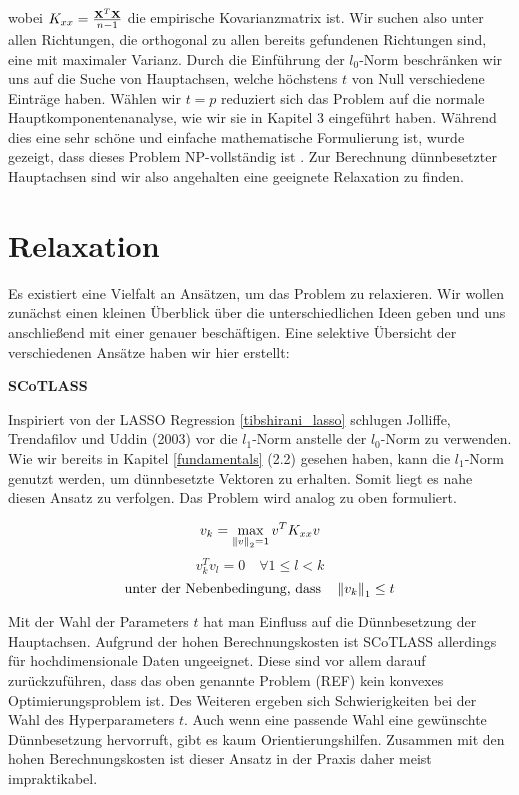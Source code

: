 wobei $K_{xx} = \frac{\mathbf{X}^T \mathbf{X}}{n-1}$ die empirische Kovarianzmatrix ist. Wir suchen also unter allen Richtungen, die orthogonal zu allen bereits gefundenen Richtungen sind, eine mit maximaler Varianz. Durch die Einführung der $l_0$-Norm beschränken wir uns auf die Suche von Hauptachsen, welche höchstens $t$ von Null verschiedene Einträge haben. Wählen wir $t = p$ reduziert sich das Problem auf die normale Hauptkomponentenanalyse, wie wir sie in Kapitel 3 eingeführt haben. Während dies eine sehr schöne und einfache mathematische Formulierung ist, wurde gezeigt, dass dieses Problem NP-vollständig ist \cite{foucart}. Zur Berechnung dünnbesetzter Hauptachsen sind wir also angehalten eine geeignete Relaxation zu finden.

\section{Relaxation} \label{relaxation}

Es existiert eine Vielfalt an Ansätzen, um das Problem zu relaxieren. Wir wollen zunächst einen kleinen Überblick über die unterschiedlichen Ideen geben und uns anschließend mit einer genauer beschäftigen. Eine selektive Übersicht der verschiedenen Ansätze haben wir hier erstellt:

\textbf{SCoTLASS}

Inspiriert von der LASSO Regression \ref{tibshirani_lasso} schlugen Jolliffe, Trendafilov und Uddin (2003) \cite{scotlass} vor die $l_1$-Norm anstelle der $l_0$-Norm zu verwenden. Wie wir bereits in Kapitel \ref{fundamentals} (2.2) gesehen haben, kann die $l_1$-Norm genutzt werden, um dünnbesetzte Vektoren zu erhalten. Somit liegt es nahe diesen Ansatz zu verfolgen. Das Problem wird analog zu oben formuliert.

$$v_{k} = \max_{\left\lVert v \right\rVert_2 = 1} v^{T}K_{xx} v$$
$$v_{k}^Tv_{l} = 0 \quad \forall 1 \leq l < k$$
$${\text{unter der Nebenbedingung, dass}}\quad \left\lVert v_{k} \right\rVert_1 \leq t$$

Mit der Wahl der Parameters $t$ hat man Einfluss auf die Dünnbesetzung der Hauptachsen. Aufgrund der hohen Berechnungskosten ist SCoTLASS allerdings für hochdimensionale Daten ungeeignet. Diese sind vor allem darauf zurückzuführen, dass das oben genannte Problem (REF) kein konvexes Optimierungsproblem ist. Des Weiteren ergeben sich Schwierigkeiten bei der Wahl des Hyperparameters $t$. Auch wenn eine passende Wahl eine gewünschte Dünnbesetzung hervorruft, gibt es kaum Orientierungshilfen. Zusammen mit den hohen Berechnungskosten ist dieser Ansatz in der Praxis daher meist impraktikabel.

